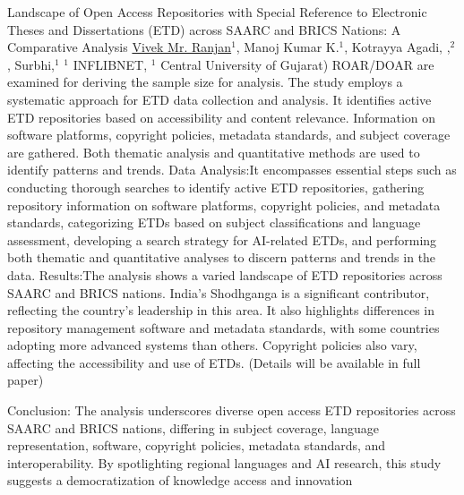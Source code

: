 \begin{abstract_online}{Landscape of Open Access Repositories with Special Reference to Electronic Theses and Dissertations (ETD) across SAARC and BRICS Nations:  A Comparative Analysis}{%
        \underline{Vivek Mr. Ranjan}$^{1}$, Manoj Kumar K.$^{1}$, Kotrayya Agadi, ,$^{2}$, Surbhi,$^{1}$}{%
        }{%
        $^1$ INFLIBNET,   $^1$ Central University of Gujarat)\newline{}
            }
	ROAR/DOAR are examined for deriving the sample size for analysis. The study employs a systematic approach for ETD data collection and analysis. It identifies active ETD repositories based on accessibility and content relevance. Information on software platforms, copyright policies, metadata standards, and subject coverage are gathered. Both thematic analysis and quantitative methods are used to identify patterns and trends. Data Analysis:It encompasses essential steps such as conducting thorough searches to identify active ETD repositories, gathering repository information on software platforms, copyright policies, and metadata standards, categorizing ETDs based on subject classifications and language assessment, developing a search strategy for AI-related ETDs, and performing both thematic and quantitative analyses to discern patterns and trends in the data. Results:The analysis shows a varied landscape of ETD repositories across SAARC and BRICS nations. India's Shodhganga is a significant contributor, reflecting the country's leadership in this area. It also highlights differences in repository management software and metadata standards, with some countries adopting more advanced systems than others. Copyright policies also vary, affecting the accessibility and use of ETDs. (Details will be available in full paper)
	
	Conclusion:
The analysis underscores diverse open access ETD repositories across SAARC and BRICS nations, differing in subject coverage, language representation, software, copyright policies, metadata standards, and interoperability. By spotlighting regional languages and AI research, this study suggests a democratization of knowledge access and innovation
    \end{abstract_online}
    
